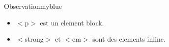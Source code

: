 \begin{center}
\setlength{\fboxrule}{2pt} %
\end{center}

\vspace{1cm}

\begin{prettyBox}{Observation}{myblue}
    \begin{itemize}
        \item \(<\)p\(>\) est un element block.
        \item \(<\)strong\(>\) et \(<\)em\(>\) sont des elements inline.
    \end{itemize}
\end{prettyBox}
